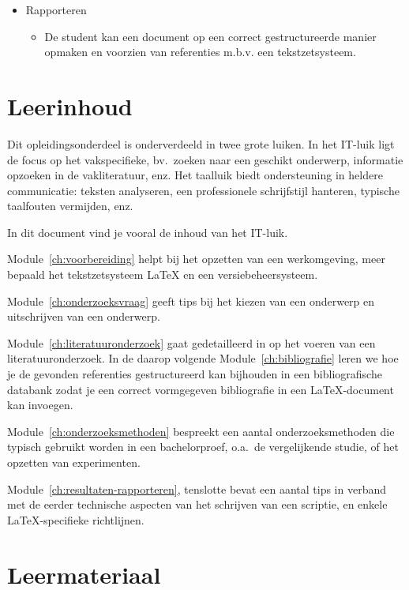 \begin{itemize}
  \item Rapporteren
        \begin{itemize}
          \item De student kan een document op een correct gestructureerde manier opmaken en voorzien van referenties m.b.v. een tekstzetsysteem.
        \end{itemize}
\end{itemize}

\section{Leerinhoud}
\label{sec:leerinhoud}

Dit opleidingsonderdeel is onderverdeeld in twee grote luiken. In het IT-luik ligt de focus op het vakspecifieke, bv.\ zoeken naar een geschikt onderwerp, informatie opzoeken in de vakliteratuur, enz. Het taalluik biedt ondersteuning in heldere communicatie: teksten analyseren, een professionele schrijfstijl hanteren, typische taalfouten vermijden, enz.

In dit document vind je vooral de inhoud van het IT-luik.

Module~\ref{ch:voorbereiding} helpt bij het opzetten van een werkomgeving, meer bepaald het tekstzetsysteem {\LaTeX} en een versiebeheersysteem.

Module~\ref{ch:onderzoeksvraag} geeft tips bij het kiezen van een onderwerp en uitschrijven van een onderwerp.

Module~\ref{ch:literatuuronderzoek} gaat gedetailleerd in op het voeren van een literatuuronderzoek. In de daarop volgende Module~\ref{ch:bibliografie} leren we hoe je de gevonden referenties gestructureerd kan bijhouden in een bibliografische databank zodat je een correct vormgegeven bibliografie in een {\LaTeX}-document kan invoegen.

Module~\ref{ch:onderzoeksmethoden} bespreekt een aantal onderzoeksmethoden die typisch gebruikt worden in een bachelorproef, o.a.\ de vergelijkende studie, of het opzetten van experimenten.

Module~\ref{ch:resultaten-rapporteren}, tenslotte bevat een aantal tips in verband met de eerder technische aspecten van het schrijven van een scriptie, en enkele {\LaTeX}-specifieke richtlijnen.

\section{Leermateriaal}
\label{sec:leermateriaal}

